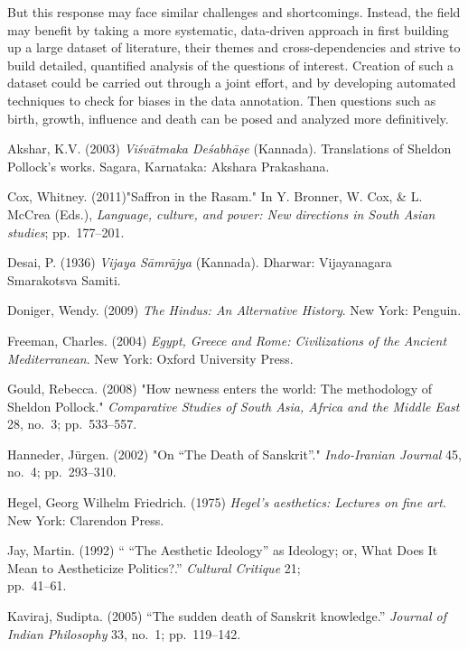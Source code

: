 But this response may face similar challenges and shortcomings. Instead, the field may benefit by taking a more systematic, data-driven approach in first building up a large dataset of literature, their themes and cross-dependencies and strive to build detailed, quantified analysis of the questions of interest. Creation of such a dataset could be carried out through a joint effort, and by developing automated techniques to check for biases in the data annotation. Then questions such as birth, growth, influence and death can be posed and analyzed more definitively.
\newpage

\begin{thebibliography}{99}
\itemsep=2pt
Akshar, K.V. (2003) {\sl Viśvātmaka Deśabhāṣe} (Kannada). Translations of Sheldon Pollock’s works. Sagara, Karnataka: Akshara Prakashana.

Cox, Whitney. (2011)"Saffron in the Rasam." In Y. Bronner, W. Cox, \& L. McCrea (Eds.), {\sl Language, culture, and power: New directions in South Asian studies}; pp.~177--201.

Desai, P. (1936) {\sl Vijaya Sāmrājya} (Kannada). Dharwar: Vijayanagara Smarakotsva Samiti.

Doniger, Wendy. (2009) {\sl The Hindus: An Alternative History}. New York: Penguin.

Freeman, Charles. (2004) {\sl Egypt, Greece and Rome: Civilizations of the Ancient Mediterranean}. New York: Oxford University Press.

Gould, Rebecca. (2008) "How newness enters the world: The methodology of Sheldon Pollock." {\sl Comparative Studies of South Asia, Africa and the Middle East} 28, no.~3; pp.~533--557.

Hanneder, Jürgen. (2002) "On “The Death of Sanskrit”." {\sl Indo-Iranian Journal} 45, no.~4; pp.~293--310.

Hegel, Georg Wilhelm Friedrich. (1975) {\sl Hegel's aesthetics: Lectures on fine art}. New York: Clarendon Press.

Jay, Martin. (1992) “ “The Aesthetic Ideology” as Ideology; or, What Does It Mean to Aestheticize Politics?.” {\sl Cultural Critique} 21;\\ pp.~41--61.

Kaviraj, Sudipta. (2005) “The sudden death of Sanskrit knowledge.” {\sl Journal of Indian Philosophy} 33, no.~1; pp.~119--142.


\end{thebibliography}
